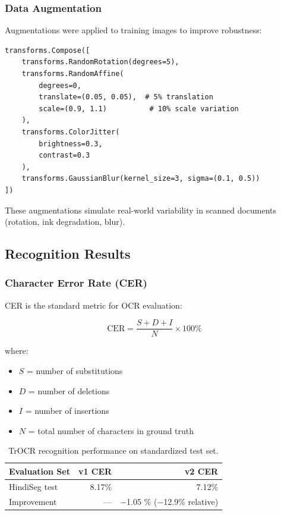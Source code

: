 \documentclass[14pt,a4paper]{article}
\begin{document}
\subsubsection{Data Augmentation}

Augmentations were applied to training images to improve robustness:

\begin{lstlisting}[caption=Handwriting-oriented augmentation pipeline]
transforms.Compose([
    transforms.RandomRotation(degrees=5),
    transforms.RandomAffine(
        degrees=0,
        translate=(0.05, 0.05),  # 5% translation
        scale=(0.9, 1.1)          # 10% scale variation
    ),
    transforms.ColorJitter(
        brightness=0.3,
        contrast=0.3
    ),
    transforms.GaussianBlur(kernel_size=3, sigma=(0.1, 0.5))
])
\end{lstlisting}

These augmentations simulate real-world variability in scanned documents (rotation, ink degradation, blur).

\subsection{Recognition Results}

\subsubsection{Character Error Rate (CER)}

CER is the standard metric for OCR evaluation:

\[ \text{CER} = \frac{S + D + I}{N} \times 100\% \]

where:
\begin{itemize}
    \item $S$ = number of substitutions
    \item $D$ = number of deletions
    \item $I$ = number of insertions
    \item $N$ = total number of characters in ground truth
\end{itemize}

\begin{table}[h]
    \centering
    \begin{tabular}{lrr}
        \toprule
        \textbf{Evaluation Set} & \textbf{v1 CER} & \textbf{v2 CER} \\
        \midrule
        HindiSeg test & 8.17\% & 7.12\% \\
        Improvement & — & $-$1.05 \% ($-$12.9\% relative) \\
        \bottomrule
    \end{tabular}
    \caption{TrOCR recognition performance on standardized test set.}
\end{table}
\end{document}
